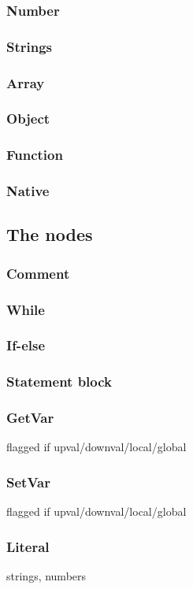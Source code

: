 \subsubsection{Number}
\subsubsection{Strings}
\subsubsection{Array}
\subsubsection{Object}
\subsubsection{Function}
\subsubsection{Native}
\subsection{The nodes}

\subsubsection{Comment}

\subsubsection{While}
\subsubsection{If-else}
\subsubsection{Statement block}
\subsubsection{GetVar}
flagged if upval/downval/local/global
\subsubsection{SetVar}
flagged if upval/downval/local/global
\subsubsection{Literal}
strings, numbers
